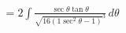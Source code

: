 \documentclass[preview]{standalone}
\begin{document}
\begin{align*}
&=2\int \frac{\sec\theta\tan\theta}{\sqrt{16(1\sec^2\theta-1)}^3} \, d\theta \\
\end{align*}
\end{document}
